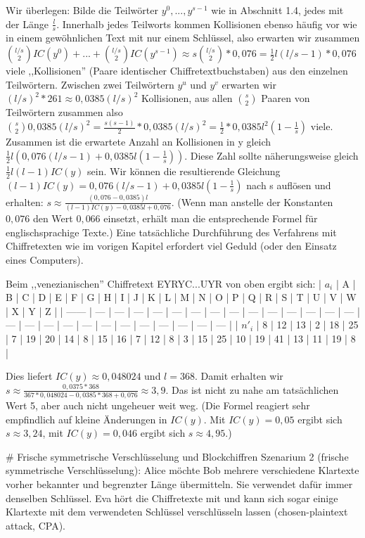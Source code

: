 \documentclass[a4paper]{article}
\begin{document}
\begin{multicols}{3}
    Wir überlegen: Bilde die Teilwörter $y^0,...,y^{s-1}$ wie in Abschnitt 1.4, jedes mit der Länge $\frac{l}{s}$. Innerhalb jedes Teilworts kommen Kollisionen ebenso häufig vor wie in einem gewöhnlichen Text mit nur einem Schlüssel, also erwarten wir zusammen $\binom{l/s}{2} IC(y^0)+...+\binom{l/s}{2} IC(y^{s-1})\approx s\binom{l/s}{2}* 0,076 = \frac{1}{2}l(l/s-1)* 0,076$ viele ,,Kollisionen''  (Paare identischer Chiffretextbuchstaben) aus den einzelnen Teilwörtern.
    Zwischen zwei Teilwörtern $y^u$ und $y^v$ erwarten wir $(l/s)^2*261\approx 0,0385(l/s)^2$ Kollisionen, aus allen $\binom{s}{2}$ Paaren von Teilwörtern zusammen also $\binom{s}{2} 0,0385(l/s)^2 =\frac{s(s-1)}{2}* 0,0385(l/s)^2 =\frac{1}{2} *0,0385 l^2 (1-\frac{1}{s})$ viele. Zusammen ist die erwartete Anzahl an Kollisionen in y gleich $\frac{1}{2}l(0,076(l/s-1) + 0,0385 l(1-\frac{1}{s}))$.
    Diese Zahl sollte näherungsweise gleich $\frac{1}{2}l(l-1)IC(y)$ sein. Wir können die resultierende Gleichung $(l-1)IC(y) = 0,076(l/s-1) + 0,0385 l(1-\frac{1}{s})$ nach s auflösen und erhalten: $s\approx \frac{(0,076-0,0385)l}{(l-1)IC(y)-0,0385l+0,076}$. (Wenn man anstelle der Konstanten $0,076$ den Wert $0,066$ einsetzt, erhält man die entsprechende Formel für englischsprachige Texte.)
    Eine tatsächliche Durchführung des Verfahrens mit Chiffretexten wie im vorigen Kapitel erfordert viel Geduld (oder den Einsatz eines Computers).

    Beim ,,venezianischen'' Chiffretext EYRYC...UYR von oben ergibt sich:
    | $a_i$  | A   | B   | C   | D   | E   | F   | G   | H   | I   | J   | K   | L   | M   | N   | O   | P   | Q   | R   | S   | T   | U   | V   | W   | X   | Y   | Z   |
    | ------ | --- | --- | --- | --- | --- | --- | --- | --- | --- | --- | --- | --- | --- | --- | --- | --- | --- | --- | --- | --- | --- | --- | --- | --- | --- | --- |
    | $n′_i$ | 8   | 12  | 13  | 2   | 18  | 25  | 7   | 19  | 20  | 14  | 8   | 15  | 16  | 7   | 12  | 8   | 3   | 15  | 25  | 10  | 19  | 41  | 13  | 11  | 19  | 8   |

    Dies liefert $IC(y)\approx 0,048024$ und $l=368$. Damit erhalten wir $s\approx\frac{0,0375*368}{367 *0,048024-0,0385 *368+0,076}\approx 3,9$.
    Das ist nicht zu nahe am tatsächlichen Wert 5, aber auch nicht ungeheuer weit weg. (Die Formel reagiert sehr empfindlich auf kleine Änderungen in $IC(y)$. Mit $IC(y)=0,05$ ergibt sich $s\approx 3,24$, mit $IC(y)=0,046$ ergibt sich $s\approx 4,95$.)

    # Frische symmetrische Verschlüsselung und Blockchiffren
    Szenarium 2 (frische symmetrische Verschlüsselung): Alice möchte Bob mehrere verschiedene Klartexte vorher bekannter und begrenzter Länge übermitteln. Sie verwendet dafür immer denselben Schlüssel. Eva hört die Chiffretexte mit und kann sich sogar einige Klartexte mit dem verwendeten Schlüssel verschlüsseln lassen (chosen-plaintext attack, CPA).


\end{multicols}
\end{document}
